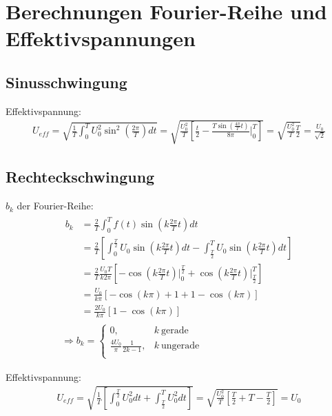 

\chapter{Berechnungen Fourier-Reihe und Effektivspannungen}
\label{app:Berechnung}

\section*{Sinusschwingung}
Effektivspannung:
\begin{gather}
    U_{eff} = \sqrt{\frac{1}{T}\int^T_0 U_0^2 \sin^2\left(\frac{2\pi}{T}\right) dt} = \sqrt{\frac{U_0^2}{T} \left[\frac{t}{2} - \frac{T\sin(\frac{4\pi}{T}t)}{8\pi}\bigg \vert^T_0 \right]} = \sqrt{\frac{U_0^2}{T}\frac{T}{2}} = \frac{U_0}{\sqrt{2}}
\end{gather}

\section*{Rechteckschwingung}
$b_k$ der Fourier-Reihe:
\begin{gather}
    \begin{aligned}
        b_k &= \frac{2}{T} \int^{T}_{0} f(t)\sin(k \frac{2\pi}{T} t)dt\\
            &= \frac{2}{T} \left[ \int^{\frac{T}{2}}_{0} U_0\sin(k \frac{2\pi}{T} t)dt - \int^{T}_{\frac{T}{2}} U_0\sin(k \frac{2\pi}{T} t)dt\right]\\
            &= \frac{2}{T}\frac{U_0T}{k2\pi} \left[-\cos(k \frac{2\pi}{T} t) \bigg \vert^{\frac{T}{2}}_{0} + \cos(k \frac{2\pi}{T} t) \bigg \vert^{T}_{\frac{T}{2}} \right]\\
            &= \frac{U_0}{k\pi} \left[-\cos(k\pi)+1 + 1 - \cos(k\pi)\right]\\
            &= \frac{2U_0}{k\pi}\left[1-\cos(k\pi)\right]
    \end{aligned}\\[0,5cm]
    \Rightarrow b_k =
    \begin{cases}
        0, & k~\text{gerade}\\
        \frac{4U_0}{\pi}\frac{1}{2k-1}, & k~\text{ungerade}\\
    \end{cases}
\end{gather}

Effektivspannung:
\begin{gather}
    U_{eff} = \sqrt{\frac{1}{T}\left[\int^{\frac{T}{2}}_0 U_0^2dt + \int^T_{\frac{T}{2}} U_0^2 dt\right]} = \sqrt{\frac{U_0^2}{T}\left[\frac{T}{2}+T-\frac{T}{2}\right]} = U_0
\end{gather}

